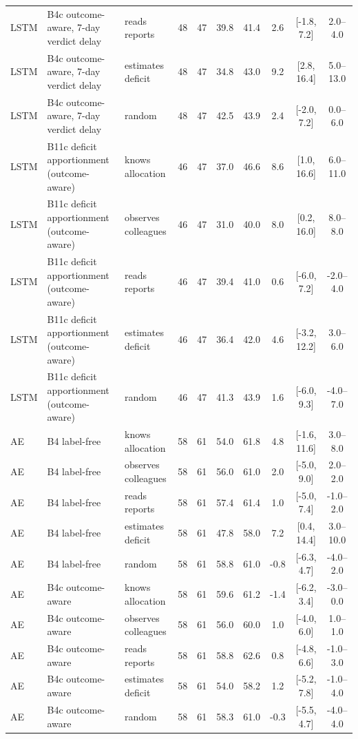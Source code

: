 \documentclass[10pt,onecolumn,letterpaper]{article}
\begin{document}
\begin{table}[!t]
\begin{tabular}{lllccccccc}
LSTM & B4c outcome-aware, 7-day verdict delay & reads reports & 48 & 47 & 39.8 & 41.4 & 2.6 & [-1.8, 7.2] & 2.0--4.0 \\
LSTM & B4c outcome-aware, 7-day verdict delay & estimates deficit & 48 & 47 & 34.8 & 43.0 & 9.2 & [2.8, 16.4] & 5.0--13.0 \\
LSTM & B4c outcome-aware, 7-day verdict delay & random & 48 & 47 & 42.5 & 43.9 & 2.4 & [-2.0, 7.2] & 0.0--6.0 \\
LSTM & B11c deficit apportionment (outcome-aware) & knows allocation & 46 & 47 & 37.0 & 46.6 & 8.6 & [1.0, 16.6] & 6.0--11.0 \\
LSTM & B11c deficit apportionment (outcome-aware) & observes colleagues & 46 & 47 & 31.0 & 40.0 & 8.0 & [0.2, 16.0] & 8.0--8.0 \\
LSTM & B11c deficit apportionment (outcome-aware) & reads reports & 46 & 47 & 39.4 & 41.0 & 0.6 & [-6.0, 7.2] & -2.0--4.0 \\
LSTM & B11c deficit apportionment (outcome-aware) & estimates deficit & 46 & 47 & 36.4 & 42.0 & 4.6 & [-3.2, 12.2] & 3.0--6.0 \\
LSTM & B11c deficit apportionment (outcome-aware) & random & 46 & 47 & 41.3 & 43.9 & 1.6 & [-6.0, 9.3] & -4.0--7.0 \\
AE & B4 label-free & knows allocation & 58 & 61 & 54.0 & 61.8 & 4.8 & [-1.6, 11.6] & 3.0--8.0 \\
AE & B4 label-free & observes colleagues & 58 & 61 & 56.0 & 61.0 & 2.0 & [-5.0, 9.0] & 2.0--2.0 \\
AE & B4 label-free & reads reports & 58 & 61 & 57.4 & 61.4 & 1.0 & [-5.0, 7.4] & -1.0--2.0 \\
AE & B4 label-free & estimates deficit & 58 & 61 & 47.8 & 58.0 & 7.2 & [0.4, 14.4] & 3.0--10.0 \\
AE & B4 label-free & random & 58 & 61 & 58.8 & 61.0 & -0.8 & [-6.3, 4.7] & -4.0--2.0 \\
AE & B4c outcome-aware & knows allocation & 58 & 61 & 59.6 & 61.2 & -1.4 & [-6.2, 3.4] & -3.0--0.0 \\
AE & B4c outcome-aware & observes colleagues & 58 & 61 & 56.0 & 60.0 & 1.0 & [-4.0, 6.0] & 1.0--1.0 \\
AE & B4c outcome-aware & reads reports & 58 & 61 & 58.8 & 62.6 & 0.8 & [-4.8, 6.6] & -1.0--3.0 \\
AE & B4c outcome-aware & estimates deficit & 58 & 61 & 54.0 & 58.2 & 1.2 & [-5.2, 7.8] & -1.0--4.0 \\
AE & B4c outcome-aware & random & 58 & 61 & 58.3 & 61.0 & -0.3 & [-5.5, 4.7] & -4.0--4.0 \\

\end{tabular}
\end{table}
\end{document}
